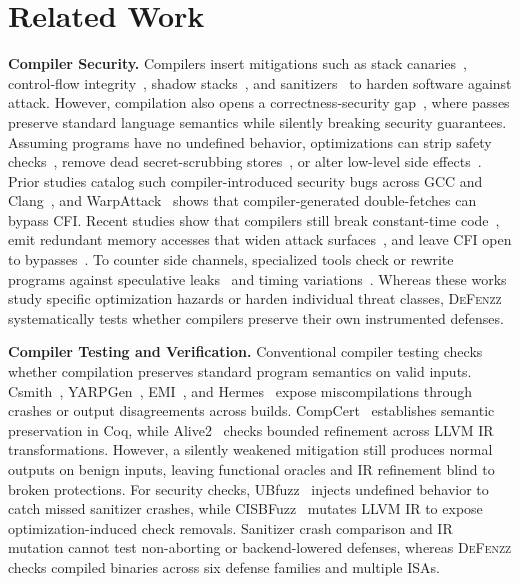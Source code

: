 \documentclass[conference,compsoc]{IEEEtran}
\begin{document}
\section{Related Work}\label{sec:related-work}

\noindent\textbf{Compiler Security.}
Compilers insert mitigations such as stack canaries~\cite{cowan1998stackguard}, control-flow integrity~\cite{abadi2009cfi,tice2014forwardcfi}, shadow stacks~\cite{kuznetsov2014cpi,burow2019shadowstacks}, and sanitizers~\cite{serebryany2012asan} to harden software against attack.
However, compilation also opens a correctness-security gap~\cite{dsilva2015correctness}, where passes preserve standard language semantics while silently breaking security guarantees.
Assuming programs have no undefined behavior, optimizations can strip safety checks~\cite{wang2013stack}, remove dead secret-scrubbing stores~\cite{yang2017deadstore}, or alter low-level side effects~\cite{simon2018whatyouc}.
Prior studies catalog such compiler-introduced security bugs across GCC and Clang~\cite{silentbugs2023}, and WarpAttack~\cite{xu2023warpattack} shows that compiler-generated double-fetches can bypass CFI.
Recent studies show that compilers still break constant-time code~\cite{schneider2025breaking}, emit redundant memory accesses that widen attack surfaces~\cite{xu2026clower}, and leave CFI open to bypasses~\cite{bajo2025await}.
To counter side channels, specialized tools check or rewrite programs against speculative leaks~\cite{guarnieri2020spectector,oleksenko2020specfuzz,vassena2021blade} and timing variations~\cite{daniel2020binsec,jiang2026vect}.
Whereas these works study specific optimization hazards or harden individual threat classes, \textsc{DeFenzz} systematically tests whether compilers preserve their own instrumented defenses.

\medskip\noindent\textbf{Compiler Testing and Verification.}
Conventional compiler testing checks whether compilation preserves standard program semantics on valid inputs.
Csmith~\cite{yang2011csmith}, YARPGen~\cite{livinskii2020yarpgen,livinskii2023loops}, EMI~\cite{le2014emi}, and Hermes~\cite{sun2016hermes} expose miscompilations through crashes or output disagreements across builds.
CompCert~\cite{leroy2009compcert} establishes semantic preservation in Coq, while Alive2~\cite{lopes2021alive2} checks bounded refinement across LLVM IR transformations.
However, a silently weakened mitigation still produces normal outputs on benign inputs, leaving functional oracles and IR refinement blind to broken protections.
For security checks, UBfuzz~\cite{li2024ubfuzz} injects undefined behavior to catch missed sanitizer crashes, while CISBFuzz~\cite{oh2026cisbfuzz} mutates LLVM IR to expose optimization-induced check removals.
Sanitizer crash comparison and IR mutation cannot test non-aborting or backend-lowered defenses, whereas \textsc{DeFenzz} checks compiled binaries across six defense families and multiple ISAs.
\end{document}
